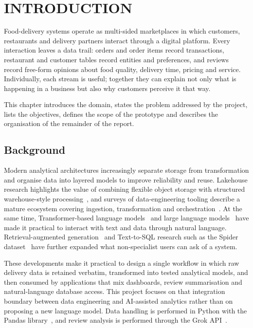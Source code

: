 \documentclass[12pt,a4paper]{report}
\begin{document}
\chapter{INTRODUCTION}

\noindent Food-delivery systems operate as multi-sided marketplaces in which customers, restaurants and delivery partners interact through a digital platform. Every interaction leaves a data trail: orders and order items record transactions, restaurant and customer tables record entities and preferences, and reviews record free-form opinions about food quality, delivery time, pricing and service. Individually, each stream is useful; together they can explain not only what is happening in a business but also why customers perceive it that way.

\noindent This chapter introduces the domain, states the problem addressed by the project, lists the objectives, defines the scope of the prototype and describes the organisation of the remainder of the report.

\section{Background}
Modern analytical architectures increasingly separate storage from transformation and organise data into layered models to improve reliability and reuse. Lakehouse research highlights the value of combining flexible object storage with structured warehouse-style processing~\cite{ref1}, and surveys of data-engineering tooling describe a mature ecosystem covering ingestion, transformation and orchestration~\cite{ref2}. At the same time, Transformer-based language models~\cite{ref3} and large language models~\cite{ref4} have made it practical to interact with text and data through natural language. Retrieval-augmented generation~\cite{ref5} and Text-to-SQL research such as the Spider dataset~\cite{ref6} have further expanded what non-specialist users can ask of a system.

These developments make it practical to design a single workflow in which raw delivery data is retained verbatim, transformed into tested analytical models, and then consumed by applications that mix dashboards, review summarisation and natural-language database access. This project focuses on that integration boundary between data engineering and AI-assisted analytics rather than on proposing a new language model. Data handling is performed in Python with the Pandas library~\cite{ref24}, and review analysis is performed through the Grok API~\cite{ref23}.
\end{document}
